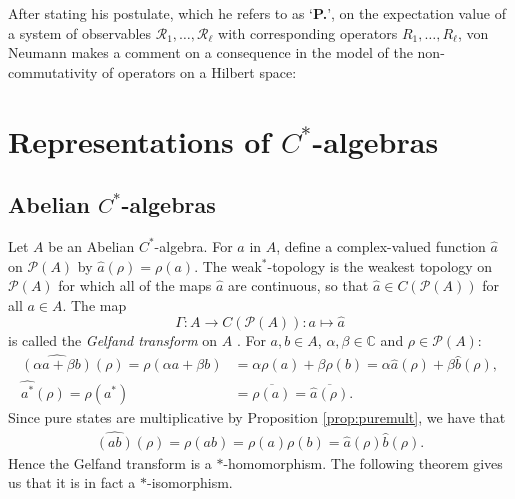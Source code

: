 \documentclass[12pt,a4paper]{report}
\theoremstyle{plain}
\theoremstyle{definition}
\newcommand{\1}{\mathbbm{1}}
\newcommand{\C}{\mathbb{C}}
\renewcommand{\P}[1]{\mathscr{P}(#1)}
\begin{document}
After stating his postulate, which he refers to as `\textbf{P.}', on the expectation value of a system 
of observables $\mathscr{R_1},\dots,\mathscr{R_\ell}$ with corresponding operators $R_1,\dots, R_\ell$, 
von Neumann makes a comment on a consequence in the model of the non-commutativity of operators on a 
Hilbert space:




\chapter{Representations of $C^\ast$-algebras}
\section{Abelian $C^\ast$-algebras}\label{section:abelian}


Let $A$ be an Abelian $C^\ast$-algebra. For $a$ in $A$, define a complex-valued function $\hat{a}$ on
$\P{A}$ by $\hat{a}(\rho)= \rho(a)$. The weak$^\ast$-topology is the weakest topology on 
$\P{A}$ for which all of the maps $\hat{a}$ are continuous, so that $\hat{a} \in C(\P{A})$ for all 
$a\in A$. The map
\[
	\Gamma:A \to C(\P{A}) : a\mapsto \hat{a}
\]
is called the \emph{Gelfand transform} on $A$ \cite{davidson96}.
For $a,b \in A$, $\alpha,\beta\in\C$ and $\rho\in\P{A}$:
\begin{align*}
	\widehat{(\alpha a+\beta b)}(\rho) = \rho(\alpha a+\beta b) 
	&=	\alpha\rho(a) +\beta\rho(b) = \alpha\hat{a}(\rho)+ \beta\hat{b}(\rho), 	\\
	\widehat{a^\ast}(\rho) = \rho(a^\ast) &= \overline{\rho(a)} = \overline{\hat{a}(\rho)}.
\end{align*}
Since pure states are multiplicative by Proposition \ref{prop:puremult}, we have that 
\begin{align*}
	\widehat{(ab)} (\rho)= \rho(ab) = \rho(a)\rho(b) = \hat{a}(\rho)\hat{b}(\rho).
\end{align*}
Hence the Gelfand transform is a $\ast$-homomorphism. The following theorem gives us that it is
in fact a $\ast$-isomorphism.
\end{document}

